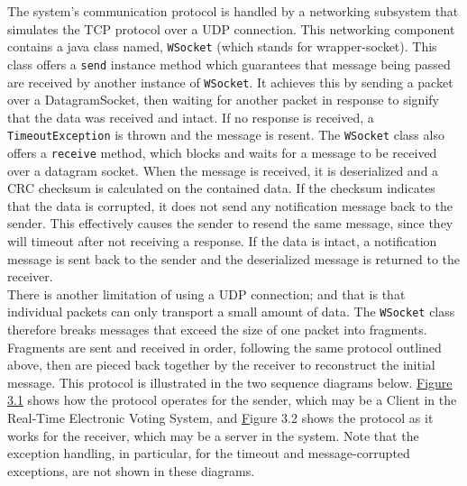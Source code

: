 \documentclass[11pt,english]{article}
\begin{document}
The system's communication protocol is handled by a networking subsystem that
simulates the TCP protocol over a UDP connection. This networking component contains a
java class named, {\tt WSocket} (which stands for wrapper-socket). This class offers a
{\tt send} instance method which guarantees that message being passed are received by another
instance of {\tt WSocket}. It achieves this by sending a packet over a DatagramSocket, 
then waiting for another packet in response to signify that the data was received and intact. 
If no response is received, a {\tt TimeoutException} is thrown and the message is resent.
The {\tt WSocket}
class also offers a {\tt receive} method, which blocks and waits for a message to be received
over a datagram socket. When the message is received, it is deserialized and a CRC
checksum is calculated on the contained data. If the checksum indicates that the data is
corrupted, it does not send any notification message back to the sender. This effectively
causes the sender to resend the same message, since they will timeout after not receiving
a response. If the data is intact, a notification message is sent back to the sender and
the deserialized message is returned to the receiver. 
\vspace{2mm}\\
There is another limitation of using a UDP connection; and that is that individual packets
can only transport a small amount of data. The {\tt WSocket} class therefore breaks messages
that exceed the size of one packet into fragments. Fragments are sent and received in order,
following the same protocol outlined above, then are pieced back together by the receiver
to reconstruct the initial message. This protocol is illustrated in the two sequence
diagrams below. \underline{Figure 3.1} shows how the protocol operates for the sender,
which may be a Client in the Real-Time Electronic Voting System, and {\underline Figure
3.2} shows the protocol as it works for
the receiver, which may be a server in the system. Note that the exception handling, in
particular, for the timeout and message-corrupted exceptions, are not shown in these
diagrams.
\end{document}
